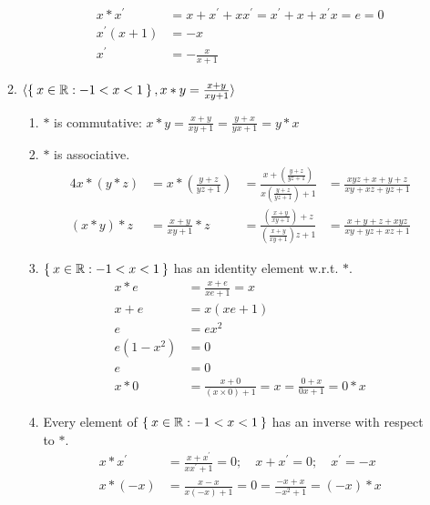 \begin{enumerate}[label={\Alph*.},font={\bfseries}]
\begin{enumerate}[label={\arabic*},font={\bfseries}]
\begin{enumerate}[label={(\roman*)}]
            \begin{align*}
              x*x^\prime &= x+x^\prime+xx^\prime=x^\prime+x+x^{\prime}x = e = 0 \\
              x^{\prime}(x+1) &= -x \\
              x^\prime &= -\frac{x}{x+1}
            \end{align*}
        \end{enumerate}
      \item $\langle\Set{x\in\mathbb{R} :-1 < x < 1}, x*y=\frac{x+y}{xy+1}\rangle$
        \begin{enumerate}[label={(\roman*)}]
          \item $*$ is commutative: $x*y=\frac{x+y}{xy+1}=\frac{y+x}{yx+1}=y*x$
          \item $*$ is associative.
            \begin{alignat*}{4}
              x*(y*z) &= x*(\frac{y+z}{yz+1})
              &= \frac{x+(\frac{y+z}{yz+1})}{x(\frac{y+z}{yz+1})+1}
              &= \frac{xyz+x+y+z}{xy+xz+yz+1} \\
              (x*y)*z &= \frac{x+y}{xy+1}*z
              &= \frac{(\frac{x+y}{xy+1})+z}{(\frac{x+y}{xy+1})z+1}
              &= \frac{x+y+z+xyz}{xy+yz+xz+1}
            \end{alignat*}
          \item $\Set{x\in\mathbb{R} : -1 < x < 1}$ has an identity element w.r.t. $*$.
            \begin{align*}
              x*e &= \frac{x+e}{xe+1} = x \\
              x+e &= x(xe+1) \\
              e &= ex^2 \\
              e(1-x^2) &= 0 \\
              e &= 0 \\
              x*0 &= \frac{x+0}{(x\times0)+1} = x = \frac{0+x}{0x+1} = 0*x
            \end{align*}
          \item Every element of $\Set{x\in\mathbb{R} : -1 < x < 1}$ has an inverse with respect to $*$.
            \begin{align*}
              x * x^\prime &= \frac{x+x^\prime}{xx^\prime+1} = 0; \quad
              x+x^\prime = 0; \quad
              x^\prime = -x \\
              x*(-x) &= \frac{x-x}{x(-x)+1} = 0 = \frac{-x+x}{-x^2+1} = (-x)*x
            \end{align*}
        \end{enumerate}

\end{enumerate}
\end{enumerate}
